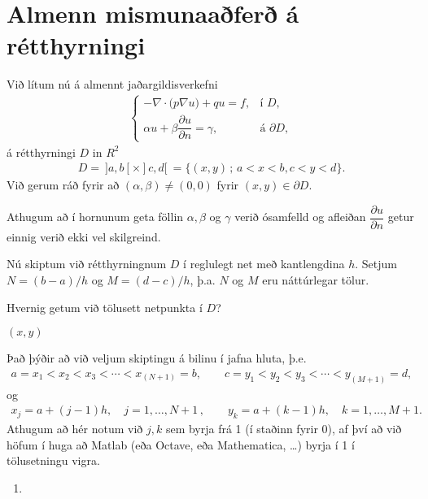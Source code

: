 \documentclass[a4paper,10pt,icelandic]{sphinxmanual}
\begin{document}
\section{Almenn mismunaaðferð á rétthyrningi}
\label{\detokenize{Kafli05:almenn-mismunaafer-a-retthyrningi}}
Við lítum nú á almennt jaðargildisverkefni
\begin{equation}\label{equation:Kafli05:eq.exercise}
\begin{split}\begin{cases}
-\nabla\cdot\big(p\nabla u\big)+qu=f, &\text{í } D,\\
\alpha  u + \beta \dfrac{\partial u}{\partial n} = \gamma,&
\text{á } \partial D,
\end{cases}\end{split}
\end{equation}
á rétthyrningi \(D\) in \(R^2\)
\begin{equation*}
\begin{split}D = \ ]a,b[\times ]c,d[ \ = \{(x,y)\, ;\, a<x<b, c<y<d\}.\end{split}
\end{equation*}
Við gerum ráð fyrir að \((\alpha,\beta ) \neq (0,0)\) fyrir \((x,y) \in \partial D\).

Athugum að í hornunum geta föllin \(\alpha, \beta\) og \(\gamma\) verið ósamfelld og afleiðan \(\dfrac{\partial u}{\partial n}\) getur einnig verið ekki vel skilgreind.

Nú skiptum við rétthyrningnum \(D\) í reglulegt net með kantlengdina \(h\).
Setjum \(N=(b-a)/h\) og \(M=(d-c)/h\), þ.a. \(N\) og \(M\) eru  náttúrlegar tölur.

Hvernig getum við tölusett netpunkta í \(D\)?

 \((x,y)\) 

Það þýðir að við veljum skiptingu á bilinu í jafna hluta, þ.e.
\begin{equation*}
\begin{split}a=x_1<x_2<x_3<⋯<x_{(N+1)}=b, \qquad c=y_1<y_2<y_3<⋯<y_{(M+1)}=d,\end{split}
\end{equation*}
og
\begin{equation*}
\begin{split}x_j=a+(j-1) h, \quad j=1, \dots, N+1\,,\qquad y_k=a+(k-1) h, \quad k=1, \dots, M+1.\end{split}
\end{equation*}
Athugum að hér notum við \(j, k\) sem byrja frá 1 (í staðinn fyrir 0), af því að við höfum í huga að Matlab (eða Octave, eða Mathematica, …) byrja í 1 í tölusetningu vigra.
\begin{enumerate}
\def\theenumi{\arabic{enumi}}
\def\labelenumi{\theenumi .}
\makeatletter\def\p@enumii{\p@enumi \theenumi .}\makeatother
\item {} 

\end{enumerate}
\end{document}
